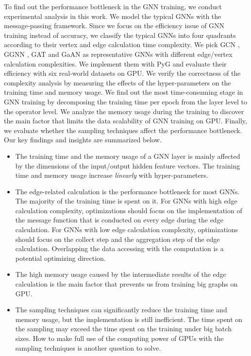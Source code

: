 To find out the performance bottleneck in the GNN training, we conduct experimental analysis in this work.
We model the typical GNNs with the message-passing framework.
Since we focus on the efficiency issue of GNN training instead of accuracy, we classify the typical GNNs into four quadrants according to their vertex and edge calculation time complexity.
We pick GCN \cite{kipf2017_gcn}, GGNN \cite{li2015_ggnn}, GAT \cite{huang2018_gat} and GaAN \cite{zhang2018_gaan} as representative GNNs with different edge/vertex calculation complexities.
We implement them with PyG and evaluate their efficiency with six real-world datasets on GPU.
We verify the correctness of the complexity analysis by measuring the effects of the hyper-parameters on the training time and memory usage.
We find out the most time-consuming stage in GNN training by decomposing the training time per epoch from the layer level to the operator level.
We analyze the memory usage during the training to discover the main factor that limits the data scalability of GNN training on GPU.
Finally, we evaluate whether the sampling techniques affect the performance bottleneck.
Our key findings and insights are summarized below.

\begin{itemize}
    \item The training time and the memory usage of a GNN layer is mainly affected by the dimensions of the input/output hidden feature vectors.
          The training time and memory usage increase \emph{linearly} with hyper-parameters.
    \item The edge-related calculation is the performance bottleneck for most GNNs.
          The majority of the training time is spent on it.
          For GNNs with high edge calculation complexity, optimizations should focus on the implementation of the message function that is conducted on every edge during the edge calculation.
          For GNNs with low edge calculation complexity, optimizations should focus on the collect step and the aggregation step of the edge calculation.
          Overlapping the data accessing with the computation is a potential optimizing direction.
    \item The high memory usage caused by the intermediate results of the edge calculation is the main factor that prevents us from training big graphs on GPU.
    \item The sampling techniques can significantly reduce the training time and memory usage, but the implementation is still inefficient. The time spent on the sampling may exceed the time spent on the training under big batch sizes. How to make full use of the computing power of GPUs with the sampling techniques is another question to solve.
\end{itemize}

